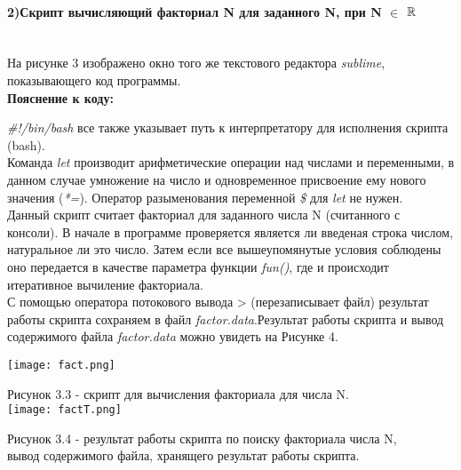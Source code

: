 	\vspace{0.2cm}
	\paragraph{2)Скрипт вычисляющий факториал N для заданного N, при N $\in$ $\mathbb{R}$\\ \\}
		На рисунке 3 изображено окно того же текстового редактора \textit{sublime}, показывающего код программы.\\

		\textbf{Пояснение к коду:\\}

		\textit{\#!/bin/bash} все также указывает путь к интерпретатору для исполнения скрипта (bash).\\
		
		Команда \textit{let} производит арифметические операции над числами и переменными, в данном случае умножение на число и одновременное присвоение ему нового значения (\textit{*=}). Оператор разыменования переменной \textit{\$} для \textit{let} не нужен.\\

		Данный скрипт считает факториал для заданного числа N (считанного с консоли). В начале в программе проверяется является ли введеная строка числом, натуральное ли это число. Затем если все вышеупомянутые условия соблюдены оно передается в качестве параметра функции \textit{fun()}, где и происходит итеративное вычиление факториала.\\

		С помощью оператора потокового вывода > (перезаписывает файл) результат работы скрипта сохраняем в файл \textit{factor.data}.Результат работы скрипта и вывод содержимого файла \textit{factor.data} можно увидеть на Рисунке 4.\\

		\vspace{0.5cm}
		\begin{center}
			\texttt{[image: fact.png]}
			
			Рисунок 3.3 - скрипт для вычисления факториала для числа N.\\
			
			\texttt{[image: factT.png]}

			Рисунок 3.4 - результат работы скрипта по поиску факториала числа N, \\ 
			вывод содержимого файла, хранящего результат работы скрипта.\\
		\end{center}